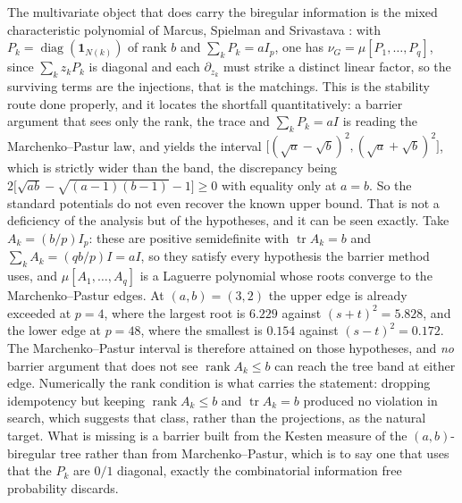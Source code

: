 \documentclass[11pt]{article}
\theoremstyle{remark}
\begin{document}
The multivariate object that does carry the biregular information is the mixed
characteristic polynomial of Marcus, Spielman and Srivastava \cite{MSSII}: with
$P_k=\operatorname{diag}(\mathbf 1_{N(k)})$ of rank $b$ and $\sum_kP_k=aI_p$, one
has $\nu_G=\mu[P_1,\dots,P_q]$, since $\sum_kz_kP_k$ is diagonal and each
$\partial_{z_k}$ must strike a distinct linear factor, so the surviving terms are
the injections, that is the matchings. This is the stability route done properly,
and it locates the shortfall quantitatively: a barrier argument that sees only
the rank, the trace and $\sum_kP_k=aI$ is reading the Marchenko--Pastur law, and
yields the interval $\bigl[(\sqrt a-\sqrt b)^2,(\sqrt a+\sqrt b)^2\bigr]$, which
is strictly wider than the band, the discrepancy being
$2\bigl[\sqrt{ab}-\sqrt{(a-1)(b-1)}-1\bigr]\ge0$ with equality only at $a=b$. So
the standard potentials do not even recover the known upper bound. That is not a
deficiency of the analysis but of the hypotheses, and it can be seen exactly. Take
$A_k=(b/p)I_p$: these are positive semidefinite with
$\operatorname{tr}A_k=b$ and $\sum_kA_k=(qb/p)I=aI$, so they satisfy every
hypothesis the barrier method uses, and $\mu[A_1,\dots,A_q]$ is a Laguerre
polynomial whose roots converge to the Marchenko--Pastur edges. At $(a,b)=(3,2)$ the
upper edge is already exceeded at $p=4$, where the largest root is $6.229$ against
$(s+t)^2=5.828$, and the lower edge at $p=48$, where the smallest is $0.154$
against $(s-t)^2=0.172$. The Marchenko--Pastur interval is therefore attained on
those hypotheses, and \emph{no} barrier argument that does not see
$\operatorname{rank}A_k\le b$ can reach the tree band at either edge. Numerically
the rank condition is what carries the statement: dropping idempotency but keeping
$\operatorname{rank}A_k\le b$ and $\operatorname{tr}A_k=b$ produced no violation in
search, which suggests that class, rather than the projections, as the natural
target. What is
missing is a barrier built from the Kesten measure of the $(a,b)$-biregular tree
rather than from Marchenko--Pastur, which is to say one that uses that the $P_k$
are $0/1$ diagonal, exactly the combinatorial information free probability
discards.
\end{document}
